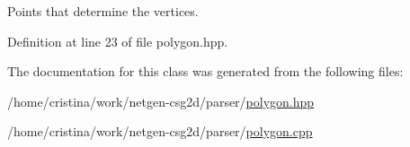 Points that determine the vertices. 



Definition at line 23 of file polygon.hpp.



The documentation for this class was generated from the following files:\begin{DoxyCompactItemize}
\item 
/home/cristina/work/netgen-\/csg2d/parser/\hyperlink{polygon_8hpp}{polygon.hpp}\item 
/home/cristina/work/netgen-\/csg2d/parser/\hyperlink{polygon_8cpp}{polygon.cpp}\end{DoxyCompactItemize}
